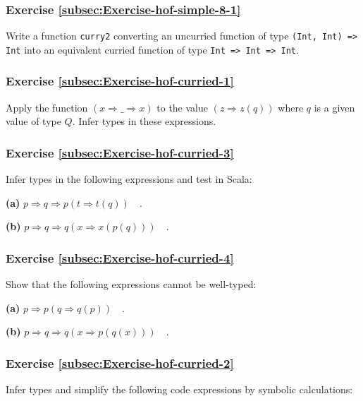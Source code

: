 \subsubsection{Exercise \label{subsec:Exercise-hof-simple-8-1}\ref{subsec:Exercise-hof-simple-8-1}}

Write a function \lstinline!curry2! converting an uncurried function
of type \texttt{}\lstinline!(Int, Int) => Int! into an equivalent
curried function of type \texttt{}\lstinline!Int => Int => Int!.

\subsubsection{Exercise \label{subsec:Exercise-hof-curried-1}\ref{subsec:Exercise-hof-curried-1}}

Apply the function $\left(x\Rightarrow\_\Rightarrow x\right)$ to
the value $\left(z\Rightarrow z(q)\right)$ where $q$ is a given
value of type $Q$. Infer types in these expressions.

\subsubsection{Exercise \label{subsec:Exercise-hof-curried-3}\ref{subsec:Exercise-hof-curried-3}}

Infer types in the following expressions and test in Scala:

\textbf{(a)} $p\Rightarrow q\Rightarrow p(t\Rightarrow t(q))\quad.$

\textbf{(b)} $p\Rightarrow q\Rightarrow q(x\Rightarrow x(p(q)))\quad.$

\subsubsection{Exercise \label{subsec:Exercise-hof-curried-4}\ref{subsec:Exercise-hof-curried-4}}

Show that the following expressions cannot be well-typed:

\textbf{(a)} $p\Rightarrow p(q\Rightarrow q(p))\quad.$

\textbf{(b)} $p\Rightarrow q\Rightarrow q(x\Rightarrow p(q(x)))\quad.$

\subsubsection{Exercise \label{subsec:Exercise-hof-curried-2}\ref{subsec:Exercise-hof-curried-2}}

Infer types and simplify the following code expressions by symbolic
calculations:

